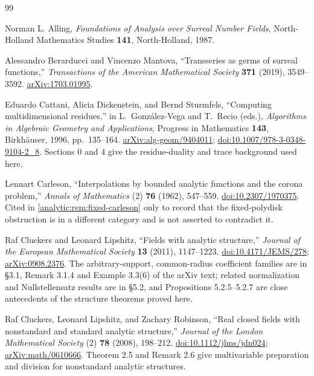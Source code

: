 \documentclass[11pt,letterpaper]{article}
\theoremstyle{definition}
\theoremstyle{remark}
\numberwithin{equation}{section}
\begin{document}
\begin{thebibliography}{99}

Norman L. Alling,
\emph{Foundations of Analysis over Surreal Number Fields},
North-Holland Mathematics Studies \textbf{141}, North-Holland, 1987.

Alessandro Berarducci and Vincenzo Mantova,
``Transseries as germs of surreal functions,''
\emph{Transactions of the American Mathematical Society} \textbf{371}
(2019), 3549--3592.
\href{https://arxiv.org/abs/1703.01995}{arXiv:1703.01995}.

Eduardo Cattani, Alicia Dickenstein, and Bernd Sturmfels,
``Computing multidimensional residues,'' in L.~Gonz\'alez-Vega and
T.~Recio (eds.), \emph{Algorithms in Algebraic Geometry and Applications},
Progress in Mathematics \textbf{143}, Birkh\"auser, 1996, pp.~135--164.
\href{https://arxiv.org/abs/alg-geom/9404011}{arXiv:alg-geom/9404011};
\href{https://doi.org/10.1007/978-3-0348-9104-2_8}{doi:10.1007/978-3-0348-9104-2\_8}.
Sections 0 and 4 give the residue-duality and trace background used here.

Lennart Carleson,
``Interpolations by bounded analytic functions and the corona problem,''
\emph{Annals of Mathematics} (2) \textbf{76} (1962), 547--559.
\href{https://doi.org/10.2307/1970375}{doi:10.2307/1970375}.
Cited in \cref{analytic:rem:fixed-carleson} only to record that the
fixed-polydisk obstruction is in a different category and is not asserted
to contradict it.

Raf Cluckers and Leonard Lipshitz,
``Fields with analytic structure,''
\emph{Journal of the European Mathematical Society} \textbf{13} (2011),
1147--1223.
\href{https://doi.org/10.4171/JEMS/278}{doi:10.4171/JEMS/278};
\href{https://arxiv.org/abs/0908.2376}{arXiv:0908.2376}.
The arbitrary-support, common-radius coefficient families are in \S3.1,
Remark 3.1.4 and Example 3.3(6) of the arXiv text; related normalization and
Nullstellensatz results are in \S5.2, and Propositions 5.2.5--5.2.7 are
close antecedents of the structure theorems proved here.

Raf Cluckers, Leonard Lipshitz, and Zachary Robinson,
``Real closed fields with nonstandard and standard analytic structure,''
\emph{Journal of the London Mathematical Society} (2) \textbf{78} (2008),
198--212.
\href{https://doi.org/10.1112/jlms/jdn024}{doi:10.1112/jlms/jdn024};
\href{https://arxiv.org/abs/math/0610666}{arXiv:math/0610666}.
Theorem 2.5 and Remark 2.6 give multivariable preparation and division for
nonstandard analytic structures.


\end{thebibliography}
\end{document}
